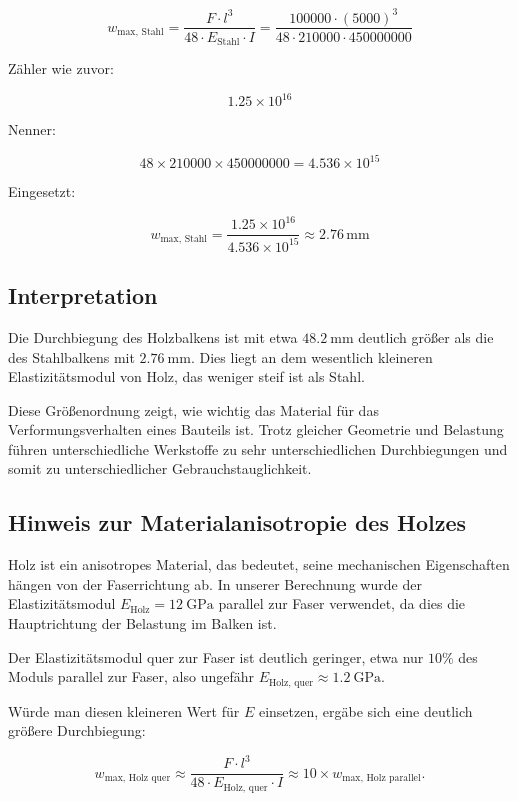 \[
w_{\text{max, Stahl}} = \frac{F \cdot l^3}{48 \cdot E_{\text{Stahl}} \cdot I}
= \frac{100000 \cdot (5000)^3}{48 \cdot 210000 \cdot 450000000}
\]

Zähler wie zuvor:

\[
1.25 \times 10^{16}
\]

Nenner:

\[
48 \times 210000 \times 450000000 = 4.536 \times 10^{15}
\]

Eingesetzt:

\[
w_{\text{max, Stahl}} = \frac{1.25 \times 10^{16}}{4.536 \times 10^{15}} \approx 2.76\, \mathrm{mm}
\]

\subsection*{Interpretation}

Die Durchbiegung des Holzbalkens ist mit etwa \(\SI{48.2}{\milli\meter}\) deutlich größer als die des Stahlbalkens mit \(\SI{2.76}{\milli\meter}\). 
Dies liegt an dem wesentlich kleineren Elastizitätsmodul von Holz, das weniger steif ist als Stahl.

Diese Größenordnung zeigt, wie wichtig das Material für das Verformungsverhalten eines Bauteils ist. 
Trotz gleicher Geometrie und Belastung führen unterschiedliche Werkstoffe zu sehr unterschiedlichen Durchbiegungen und somit zu unterschiedlicher Gebrauchstauglichkeit.

\subsection*{Hinweis zur Materialanisotropie des Holzes}

Holz ist ein anisotropes Material, das bedeutet, seine mechanischen Eigenschaften hängen von der Faserrichtung ab. 
In unserer Berechnung wurde der Elastizitätsmodul \( E_{\text{Holz}} = \SI{12}{\giga\pascal} \) parallel zur Faser verwendet, da dies die Hauptrichtung der Belastung im Balken ist.

Der Elastizitätsmodul quer zur Faser ist deutlich geringer, etwa nur \(10\%\) des Moduls parallel zur Faser, also ungefähr \( E_{\text{Holz, quer}} \approx \SI{1.2}{\giga\pascal} \).

Würde man diesen kleineren Wert für \( E \) einsetzen, ergäbe sich eine deutlich größere Durchbiegung:

\[
w_{\text{max, Holz quer}} \approx \frac{F \cdot l^3}{48 \cdot E_{\text{Holz, quer}} \cdot I} \approx 10 \times w_{\text{max, Holz parallel}}.
\]

